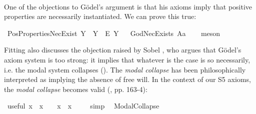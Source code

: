 \begin{isabellebody}
%
%
%
\isamarkupfalse%
\ {\isacharminus}\ %
\isanewline
\ \ %
%
%
%
\begin{isamarkuptext}%
One of the objections to G\"odel's argument is that his axioms imply that positive properties are necessarily instantiated.
We can prove this true:%
\end{isamarkuptext}\isamarkuptrue%
\isamarkupfalse%
\ PosPropertiesNecExist{\isacharcolon}\ {\isachardoublequoteopen}{\isasymlfloor}\isactrlbold {\isasymforall}Y{\isachardot}\ {\isasymP}\ Y\ \isactrlbold {\isasymrightarrow}\ \isactrlbold {\isasymbox}\isactrlbold {\isasymexists}\isactrlsup E\ Y{\isasymrfloor}{\isachardoublequoteclose}%
\ %
%
\isamarkupfalse%
\ GodNecExists\ A{}a\isanewline
\ \ \isamarkupfalse%
\ meson\ %
%
%
%
%
\begin{isamarkuptext}%
Fitting \cite{Fitting} also discusses the objection raised by Sobel \cite{sobel2004logic}, who argues that G\"odel's axiom system
is too strong: it implies that whatever is the case is so necessarily, i.e. the modal system collapses (\isa{{\isasymphi}\ {\isasymlongrightarrow}\ {\isasymbox}{\isasymphi}}).
The \emph{modal collapse} has been philosophically interpreted as implying the absence of free will.    
In the context of our S5 axioms, the \emph{modal collapse} becomes valid (\cite{Fitting}, pp. 163-4):%
\end{isamarkuptext}\isamarkuptrue%
\isamarkupfalse%
\ useful{\isacharcolon}\ {\isachardoublequoteopen}{\isacharparenleft}{\isasymforall}x{\isachardot}\ {\isasymphi}\ x\ {\isasymlongrightarrow}\ {\isasympsi}{\isacharparenright}\ {\isasymLongrightarrow}\ {\isacharparenleft}{\isacharparenleft}{\isasymexists}x{\isachardot}\ {\isasymphi}\ x{\isacharparenright}\ {\isasymlongrightarrow}\ {\isasympsi}{\isacharparenright}{\isachardoublequoteclose}%
\ %
%
\isamarkupfalse%
\ simp\ %
%
%
%
\isanewline
{}\isamarkupfalse%
\ ModalCollapse{\isacharcolon}\ {\isachardoublequoteopen}{\isasymlfloor}\isactrlbold {\isasymforall}{\isasymPhi}{\isachardot}{\isacharparenleft}{\isasymPhi}\ \isactrlbold {\isasymrightarrow}\ {\isacharparenleft}\isactrlbold {\isasymbox}\ {\isasymPhi}{\isacharparenright}{\isacharparenright}{\isasymrfloor}{\isachardoublequoteclose}\isanewline
%
%
%
\isamarkupfalse%
\ {\isacharminus}\isanewline
\ \ \isacommand{{\isacharbraceleft}}\isamarkupfalse%

\end{isabellebody}
